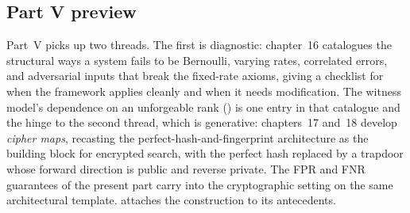 \subsection*{Part V preview}

Part~V picks up two threads. The first is diagnostic: chapter~16
catalogues the structural ways a system fails to be Bernoulli, varying
rates, correlated errors, and adversarial inputs that break the
fixed-rate axioms, giving a checklist for when the framework applies
cleanly and when it needs modification. The witness model's dependence on
an unforgeable rank () is one entry in
that catalogue and the hinge to the second thread, which is generative:
chapters~17 and~18 develop \emph{cipher maps}, recasting the
perfect-hash-and-fingerprint architecture as the building block for
encrypted search, with the perfect hash replaced by a trapdoor whose
forward direction is public and reverse private. The FPR and FNR
guarantees of the present part carry into the cryptographic setting on
the same architectural template.  attaches the
construction to its antecedents.
